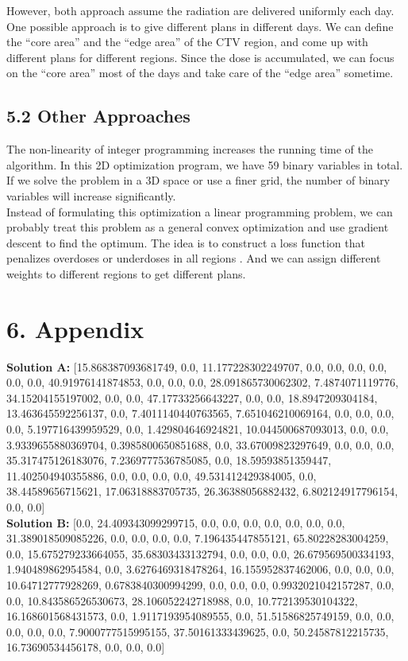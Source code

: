 \documentclass{report}
\begin{document}
However, both approach assume the radiation are delivered uniformly each day. One possible approach is to give different plans in different days. We can define the ``core area'' and the ``edge area'' of the CTV region, and come up with different plans for different regions. Since the dose is accumulated, we can focus on the ``core area'' most of the days and take care of the ``edge area'' sometime.

\subsection{5.2 Other Approaches}
The non-linearity of integer programming increases the running time of the algorithm. In this 2D optimization program, we have 59 binary variables in total. If we solve the problem in a 3D space or use a finer grid, the number of binary variables will increase significantly.\\

Instead of formulating this optimization a linear programming problem, we can probably treat this problem as a general convex optimization and use gradient descent to find the optimum. The idea is to construct a loss function that penalizes overdoses or underdoses in all regions . And we can assign different weights to different regions to get different plans.


\section{6. Appendix}

\textbf{Solution A:}
[15.868387093681749, 0.0, 11.177228302249707, 0.0, 0.0, 0.0, 0.0, 0.0, 0.0, 40.91976141874853, 0.0, 0.0, 0.0, 28.091865730062302, 7.4874071119776, 34.15204155197002, 0.0, 0.0, 47.17733256643227, 0.0, 0.0, 18.8947209304184, 13.463645592256137, 0.0, 7.4011140440763565, 7.651046210069164, 0.0, 0.0, 0.0, 0.0, 5.197716439959529, 0.0, 1.429804646924821, 10.044500687093013, 0.0, 0.0, 3.9339655880369704, 0.3985800650851688, 0.0, 33.67009823297649, 0.0, 0.0, 0.0, 35.317475126183076, 7.2369777536785085, 0.0, 18.59593851359447, 11.402504940355886, 0.0, 0.0, 0.0, 0.0, 49.531412429384005, 0.0, 38.44589656715621, 17.06318883705735, 26.36388056882432, 6.802124917796154, 0.0, 0.0] \\

\textbf{Solution B:}
[0.0, 24.409343099299715, 0.0, 0.0, 0.0, 0.0, 0.0, 0.0, 0.0, 31.389018509085226, 0.0, 0.0, 0.0, 0.0, 7.196435447855121, 65.80228283004259, 0.0, 15.675279233664055, 35.68303433132794, 0.0, 0.0, 0.0, 26.679569500334193, 1.940489862954584, 0.0, 3.6276469318478264, 16.155952837462006, 0.0, 0.0, 0.0, 10.64712777928269, 0.6783840300994299, 0.0, 0.0, 0.0, 0.9932021042157287, 0.0, 0.0, 10.843586526530673, 28.106052242718988, 0.0, 10.772139530104322, 16.168601568431573, 0.0, 1.9117193954089555, 0.0, 51.51586825749159, 0.0, 0.0, 0.0, 0.0, 0.0, 7.9000777515995155, 37.50161333439625, 0.0, 50.24587812215735, 16.73690534456178, 0.0, 0.0, 0.0] \\
\end{document}
